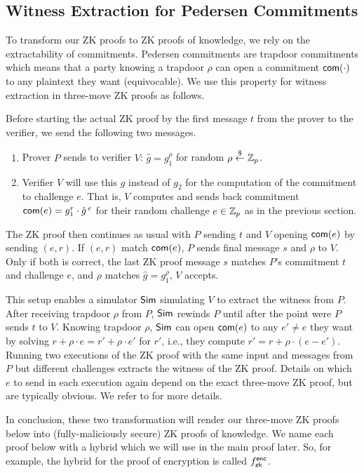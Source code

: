 \subsection{Witness Extraction for Pedersen Commitments}
To transform our ZK proofs to ZK proofs of knowledge, we rely on the
extractability of commitments.  Pedersen commitments are trapdoor
commitments which means that a party knowing a trapdoor $\rho$ can
open a commitment $\mathsf{com}(\cdot)$ to any plaintext they want
(equivocable).  We use this property for witness extraction in
three-move ZK proofs as follows.

Before starting the actual ZK proof by the first message $t$ from the
prover to the verifier, we send the following two messages.
\begin{enumerate}[leftmargin=*]
\item Prover $P$ sends to verifier $V$: $\hat{g}=g_1^\rho$ for random
  $\rho\stackrel{\$}{\leftarrow}\mathbb{Z}_p$. 
  \item Verifier $V$ will use this $\hat{g}$ instead of $g_2$ for the computation of the
    commitment to challenge $e$.  That is, $V$ computes and sends back
    commitment $\mathsf{com}(e)=g_1^r\cdot{}\hat{g}^{\,e}$ for their random challenge
    $e\in\mathbb{Z}_p$ as in the previous section.
\end{enumerate}

The ZK proof then continues as usual with $P$ sending $t$ and $V$
opening $\mathsf{com}(e)$ by sending $(e,r)$. If $(e,r)$ match $\mathsf{com}(e)$,
$P$ sends final message $s$ and $\rho$ to $V$. Only if
both is correct, the last ZK proof message $s$ matches $P$'s
commitment $t$ and challenge $e$, and $\rho$ matches $\hat{g}=g_1^\rho$, $V$
accepts.

This setup enables a simulator ${\mathsf{Sim}}$ simulating $V$ to extract the
witness from $P$. After receiving trapdoor $\rho$ from $P$, ${\mathsf{Sim}}$
rewinds $P$ until after the point were $P$ sends $t$ to $V$. Knowing
trapdoor $\rho$, ${\mathsf{Sim}}$ can open $\mathsf{com}(e)$ to any $e'\neq{}e$ they
want by solving $r+\rho\cdot{}e=r'+\rho\cdot{}e'$ for $r'$, i.e., they
compute $r'=r+\rho\cdot{}(e-e')$. Running two executions of the ZK
proof with the same input and messages from $P$ but different
challenges extracts the witness of the ZK proof. Details on which $e$
to send in each execution again depend on the exact three-move ZK
proof, but are typically obvious. We refer to \citet{efficient2pc} for
more details.

In conclusion, these two transformation will render our three-move ZK
proofs below into (fully-maliciously secure) ZK proofs of knowledge. We
name each proof below with a hybrid which we will use in the main
proof later. So, for example, the hybrid for the proof of encryption
is called ${f^{\mathsf{enc}}_{\mathsf{zk}}}$.


